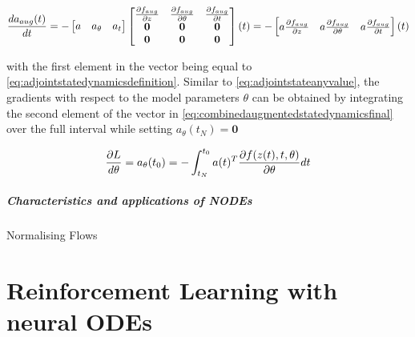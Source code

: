 \documentclass[10pt]{reportMaster}
\begin{document}
\begin{equation}
\label{eq:combinedaugmentedstatedynamicsfinal}
 \frac{da_{aug}(t)}{dt} 
 = 
 -  \begin{bmatrix}
 a & a_{\theta} & a_{t}
  \end{bmatrix}
  \begin{bmatrix}
 \frac{\partial f_{aug}}{\partial z} & \frac{\partial f_{aug}}{\partial \theta}  & \frac{\partial f_{aug}}{\partial t} \\
\textbf{0} & \textbf{0} & \textbf{0} \\
\textbf{0} & \textbf{0} & \textbf{0} \\
  \end{bmatrix} (t)
 =
-  \begin{bmatrix}
 a\frac{\partial f_{aug}}{\partial z} & a \frac{\partial f_{aug}}{\partial \theta} & a \frac{\partial f_{aug}}{\partial t}  \\
 \end{bmatrix} (t)\\
\end{equation}

with the first element in the vector being equal to \ref{eq:adjointstatedynamicsdefinition}. Similar to \ref{eq:adjointstateanyvalue}, the gradients with respect to the model parameters $\theta$ can be obtained by integrating the second element of the vector in \ref{eq:combinedaugmentedstatedynamicsfinal} over the full interval while setting $a_{\theta}(t_{N}) =  \textbf{0}$

\begin{equation}
\label{eq:gradientmodelparameters}
 \frac{\partial L}{d\theta} = a_{\theta}(t_{0}) = - \int_{t_{N}}^{t_{0}} a(t)^{T} \frac{\partial f(z(t), t, \theta)}{\partial \theta} dt\\
\end{equation}


\paragraph{Characteristics and applications of NODEs}


Normalising Flows \cite{rezende2015variational}

\chapter{Reinforcement Learning with neural ODEs} \label{Reinforcement Learning with neural ODEs}
\end{document}
